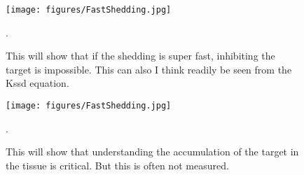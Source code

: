 \begin{figure}[H]
\centering
\texttt{[image: figures/FastShedding.jpg]}
\caption{This will show that if the shedding is super fast, inhibiting the target is impossible.  This can also I think readily be seen from the Kssd equation. 
\label{fig:shedding}}.
\end{figure}

\begin{figure}[H]
\centering
\texttt{[image: figures/FastShedding.jpg]}
\caption{This will show that understanding the accumulation of the target in the tissue is critical.  But this is often not measured.  
\label{fig:accumulation}}.
\end{figure}